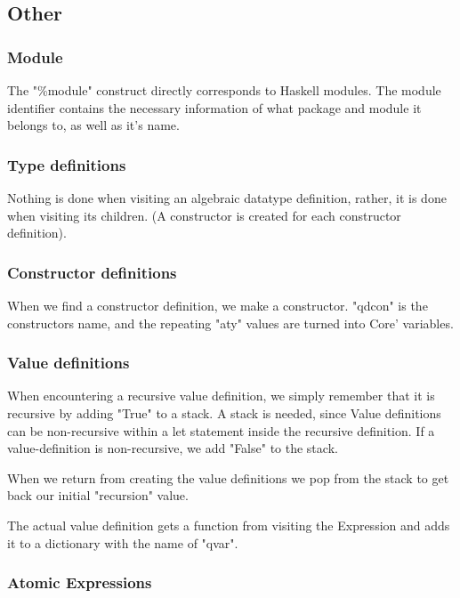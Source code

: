 \subsection{Other}

\subsubsection{Module}

The "\%module" construct directly corresponds to Haskell modules. The module identifier
contains the necessary information of what package and module it belongs to, as
well as it's name.

\subsubsection{Type definitions}

Nothing is done when visiting an algebraic datatype definition, rather, it is done when 
visiting its children. (A constructor is created for each constructor definition).

\subsubsection{Constructor definitions}

When we find a constructor definition, we make a constructor. "qdcon" is the 
constructors name, and the repeating "aty" values are turned into Core' variables.

\subsubsection{Value definitions}

When encountering a recursive value definition, we simply remember that it is
recursive by adding "True" to a stack. A stack is needed, since Value definitions
can be non-recursive within a let statement inside the recursive definition. If
a value-definition is non-recursive, we add "False" to the stack.

When we return from creating the value definitions we pop from the stack to get
back our initial "recursion" value.

The actual value definition gets a function from visiting the Expression and adds 
it to a dictionary with the name of "qvar".

\subsubsection{Atomic Expressions}

